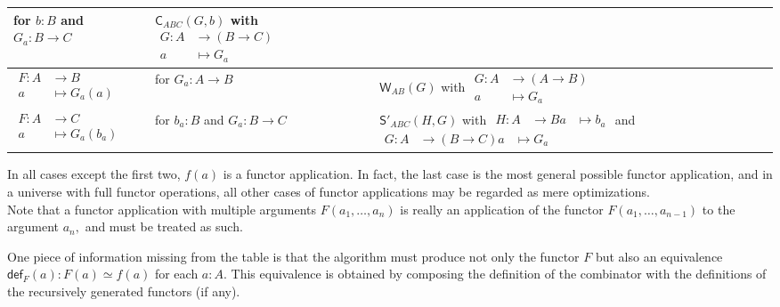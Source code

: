 \documentclass[a4paper]{article}
\theoremstyle{definition}
\theoremstyle{remark}
\renewcommand{\equiv}{\simeq}
\newcommand{\nm}{\mathsf}
\newcommand{\fndef}[1]{\nm{def}_{#1}}
\newcommand{\combinator}{\nm}
\newcommand{\swapFun}{\combinator{C}}
\newcommand{\dupFun}{\combinator{W}}
\newcommand{\substFun}{\combinator{S'}}
\begin{document}
\begin{longtable}{ll|l}
  \parbox{3cm}{for $b : B$ \\ and $G_a : B \to C$} &
  $\swapFun_{ABC}(G,b)$ with
  $\begin{aligned}
    G : A &\to     (B \to C)\\
        a &\mapsto G_a
  \end{aligned}$\\
  \hline
  \rule{0pt}{2em}
  $\begin{aligned}
    F : A &\to     B\\
        a &\mapsto G_a(a)
  \end{aligned}$ &
  for $G_a : A \to B$ &
  $\dupFun_{AB}(G)$ with
  $\begin{aligned}
    G : A &\to     (A \to B)\\
        a &\mapsto G_a
  \end{aligned}$\\
  \hline
  \rule{0pt}{3em}
  $\begin{aligned}
    F : A &\to     C\\
        a &\mapsto G_a(b_a)
  \end{aligned}$ &
  \parbox{3cm}{for $b_a : B$ \\ and $G_a : B \to C$} &
  \parbox{6cm}{
    $\substFun_{ABC}(H,G)$ with \\[1ex]
    $\begin{aligned}
      H : A &\to     B\\
          a &\mapsto b_a
    \end{aligned}$
    and
    $\begin{aligned}
      G : A &\to     (B \to C)\\
          a &\mapsto G_a
    \end{aligned}$
  }
\end{longtable}

In all cases except the first two, $f(a)$ is a functor application. In fact, the
last case is the most general possible functor application, and in a universe with
full functor operations, all other cases of functor applications may be regarded as
mere optimizations.\\
Note that a functor application with multiple arguments $F(a_1,\ldots,a_n)$ is
really an application of the functor $F(a_1,\ldots,a_{n-1})$ to the argument $a_n,$
and must be treated as such.

One piece of information missing from the table is that the algorithm must produce
not only the functor $F$ but also an equivalence
$\fndef{F}(a) : F(a) \equiv f(a)$ for each $a : A.$ This equivalence is obtained by
composing the definition of the combinator with the definitions of the recursively
generated functors (if any).
\end{document}

